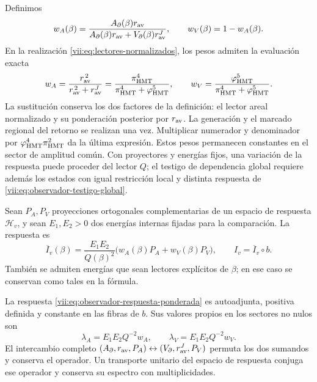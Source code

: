 Definimos
\[
 w_A(\beta)=
 \frac{A_\partial(\beta)r_{\rm av}}
 {A_\partial(\beta)r_{\rm av}+V_\partial(\beta)r_{\rm av}^{J}},
 \qquad w_V(\beta)=1-w_A(\beta).
\]
En la realización \eqref{vii:eq:lectores-normalizados}, los pesos
admiten la evaluación exacta
\begin{equation}
 w_A=\frac{r_{\rm av}^{\,2}}{r_{\rm av}^{\,2}+r_{\rm av}^{J}}
     =\frac{\pi_{\rm HMT}^{4}}
            {\pi_{\rm HMT}^{4}+\varphi_{\rm HMT}^{5}},\qquad
 w_V=\frac{\varphi_{\rm HMT}^{5}}
            {\pi_{\rm HMT}^{4}+\varphi_{\rm HMT}^{5}}.
 \label{vii:eq:pesos-amplitud-comun}
\end{equation}
La sustitución conserva los dos factores de la definición: el lector
areal normalizado y su ponderación posterior por \(r_{\rm av}\).
La generación y el marcado regional del retorno se realizan una vez.
Multiplicar numerador
y denominador por \(\varphi_{\rm HMT}^4\pi_{\rm HMT}^2\)
da la última expresión. Estos pesos permanecen constantes en el
sector de amplitud común. Con proyectores y energías fijos, una
variación de la respuesta puede proceder del lector \(Q\);
el testigo de dependencia global requiere además los estados con
igual restricción local y distinta respuesta de
\eqref{vii:eq:observador-testigo-global}.


Sean \(P_A,P_V\) proyecciones ortogonales complementarias de un
espacio de respuesta \(\mathcal H_v\), y sean \(E_1,E_2>0\)
dos energías internas fijadas para la comparación. La respuesta es
\begin{equation}
 \overline I_v(\beta)=\frac{E_1E_2}{Q(\beta)^2}
       \bigl(w_A(\beta)P_A+w_V(\beta)P_V\bigr),
 \qquad I_v=\overline I_v\circ b.
 \label{vii:eq:observador-respuesta-ponderada}
\end{equation}
También se admiten energías que sean lectores explícitos de
\(\beta\); en ese caso se conservan como tales en la fórmula.

\begin{proposition}
\label{vii:prop:observador-respuesta-positiva}
La respuesta \eqref{vii:eq:observador-respuesta-ponderada} es
autoadjunta, positiva definida y constante en las fibras de \(b\).
Sus valores propios en los sectores no nulos son
\[
 \lambda_A=E_1E_2Q^{-2}w_A,\qquad
 \lambda_V=E_1E_2Q^{-2}w_V.
\]
El intercambio completo
\((A_\partial,r_{\rm av},P_A)
 \leftrightarrow(V_\partial,r_{\rm av}^{J},P_V)\)
permuta los dos sumandos y conserva el operador. Un transporte
unitario del espacio de respuesta conjuga ese operador y conserva
su espectro con multiplicidades.
\end{proposition}

